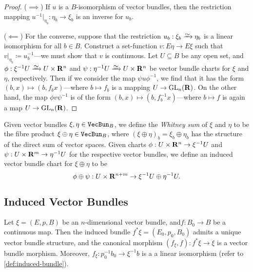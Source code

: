 \documentclass[../../../deep-dive]{subfile}
\begin{document}
\begin{proof}
    (\(\implies\)) If \(u\) is a \(B\)-isomorphism of vector bundles, then the
    restriction mapping \(u^{-1}|_{\eta_b}: \eta_b \to \xi_b\) is an inverse for
    \(u_b\).

    (\(\impliedby\)) For the converse, suppose that the restriction
    \(u_b: \xi_b \isoto \eta_b\) is a linear isomorphism for all \(b \in
    B\). Construct a set-function \(v: E \eta \to E \xi\) such that
    \(v|_{\eta_b} \coloneq u_b^{-1}\)---we must show that \(v\) is continuous. Let
    \(U \subseteq B\) be any open set, and \(\phi: \xi^{-1} U \isoto U \times \R^n\)
    and \(\psi: \eta^{-1} U \isoto U \times \R^n\) be vector bundle charts for
    \(\xi\) and \(\eta\), respectively. Then if we consider the map
    \(\psi u \phi^{-1}\), we find that it has the form
    \((b, x) \mapsto (b, f_b x)\)---where \(b \mapsto f_b\) is a mapping
    \(U \to \operatorname{GL}_n(\mathbf{R})\). On the other hand, the map \(\phi v \psi^{-1}\) is of the
    form \((b, x) \mapsto (b, f_b^{-1} x)\)---where \(b \mapsto f\) is again a map
    \(U \to \operatorname{GL}_n(\mathbf{R})\).
\end{proof}

\begin{definition}
    \label{def:whitney-sum}
    Given vector bundles \(\xi, \eta \in {\texttt{VecBun}}_B\), we define the \emph{Whitney
        sum} of \(\xi\) and \(\eta\) to be the fibre product
    \(\xi \oplus \eta \in {\texttt{VecBun}}_B\), where
    \((\xi \oplus \eta)_b = \xi_b \oplus \eta_b\) has the structure of the direct
    sum of vector spaces. Given charts \(\phi: U \times \mathbf{R}^n \to \xi^{-1} U\) and
    \(\psi: U \times \mathbf{R}^m \to \eta^{-1} U\) for the respective vector bundles, we
    define an induced vector bundle chart for \(\xi \oplus \eta\) to be
    \[
        \phi \oplus \psi: U \times \mathbf{R}^{n+m} \to \xi^{-1} U \oplus \eta^{-1} U.
    \]

\end{definition}

\subsection{Induced Vector Bundles}

\begin{proposition}
    \label{prop:induced-vector-bundle}
    Let \(\xi = (E, p, B)\) be an \(n\)-dimensional vector bundle,
    and\(f: B_0 \to B\) be a continuous map. Then the induced bundle
    \(f^{*} \xi = (E_0, p_0, B_0)\) admits a unique vector bundle structure, and the
    canonical morphism \((f_{\xi}, f): f^{*} \xi \to \xi\) is a vector bundle
    morphism. Moreover, \(f_{\xi}: p_0^{-1} b_0 \to \xi^{-1} b\) is a a linear
    isomorphism (refer to \cref{def:induced-bundle}).
\end{proposition}
\end{document}
